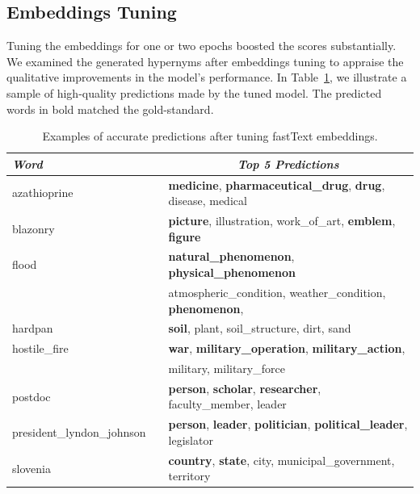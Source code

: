 \subsection{Embeddings Tuning}
Tuning the embeddings for one or two epochs boosted the scores substantially.  We examined the generated hypernyms after embeddings tuning to appraise the qualitative improvements in the model's performance.  In Table~\ref{tab:ft_tuned_predictions}, we illustrate a sample of high-quality predictions made by the tuned model.  The predicted words in bold matched the gold-standard.
\begin{table}\centering
    \begin{tabular}{@{}lcl@{}} \toprule
    \textit{Word} & \phantom{a} & \multicolumn{1}{c}{\textit{Top 5 Predictions}} \\ \midrule
    azathioprine && \textbf{medicine}, \textbf{pharmaceutical\_drug}, \textbf{drug}, disease, medical\\
    blazonry && \textbf{picture}, illustration, work\_of\_art, \textbf{emblem}, \textbf{figure}\\
    flood && \textbf{natural\_phenomenon}, \textbf{physical\_phenomenon}\\
    && atmospheric\_condition, weather\_condition, \textbf{phenomenon},\\
    hardpan && \textbf{soil}, plant, soil\_structure, dirt, sand\\
    hostile\_fire && \textbf{war}, \textbf{military\_operation}, \textbf{military\_action},\\ 
    && military, military\_force\\
    postdoc && \textbf{person}, \textbf{scholar}, \textbf{researcher}, faculty\_member, leader\\
    president\_lyndon\_johnson && \textbf{person}, \textbf{leader}, \textbf{politician}, \textbf{political\_leader}, legislator\\
    slovenia && \textbf{country}, \textbf{state}, city, municipal\_government, territory\\    
    \bottomrule
    \end{tabular}
    \caption{Examples of accurate predictions after tuning fastText embeddings.}\label{tab:ft_tuned_predictions}
\end{table}

